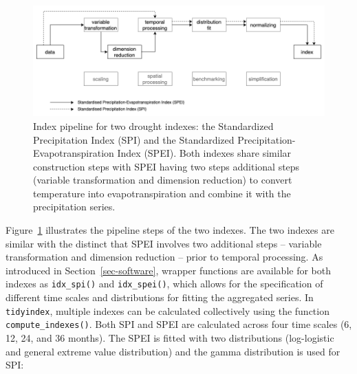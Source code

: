 \documentclass[
]{interact}
\begin{document}
\begin{figure}

{\centering \includegraphics[width=1\textwidth,height=0.9\textheight]{figures/pipeline-spei.png}

}

\caption{\label{fig-spei}Index pipeline for two drought indexes: the
Standardized Precipitation Index (SPI) and the Standardized
Precipitation-Evapotranspiration Index (SPEI). Both indexes share
similar construction steps with SPEI having two steps additional steps
(variable transformation and dimension reduction) to convert temperature
into evapotranspiration and combine it with the precipitation series.}

\end{figure}

Figure~\ref{fig-spei} illustrates the pipeline steps of the two indexes.
The two indexes are similar with the distinct that SPEI involves two
additional steps -- variable transformation and dimension reduction --
prior to temporal processing. As introduced in
Section~\ref{sec-software}, wrapper functions are available for both
indexes as \texttt{idx\_spi()} and \texttt{idx\_spei()}, which allows
for the specification of different time scales and distributions for
fitting the aggregated series. In \texttt{tidyindex}, multiple indexes
can be calculated collectively using the function
\texttt{compute\_indexes()}. Both SPI and SPEI are calculated across
four time scales (6, 12, 24, and 36 months). The SPEI is fitted with two
distributions (log-logistic and general extreme value distribution) and
the gamma distribution is used for SPI:
\end{document}
